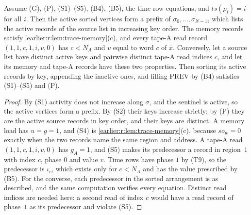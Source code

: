 \begin{lemma}\label{earlier:r:lem:trace-sorted}
Assume (G), (P), (S1)--(S5), (B4), (B5), the time-row equations, and
\(\mathit{ts}(\rho_i)=i\) for all \(i\). Then the active sorted vertices
form a prefix of \(\sigma_0,\ldots,\sigma_{N-1}\), which lists the active
records of the source list in increasing key order. The memory records
satisfy \cref{earlier:r:lem:trace-memory}(c), and every tape-A read record
\((1,1,c,1,i,v,0)\) has \(c<N_A\) and \(v\) equal to word \(c\) of
\(\bar x\). Conversely, let a source list have distinct active keys and
pairwise distinct tape-A read indices \(c\), and let its memory and
tape-A records have these two properties. Then sorting its active
records by key, appending the inactive ones, and filling
\(\mathrm{PREV}\) by (B4) satisfies (S1)--(S5) and (P).
\end{lemma}
\begin{proof}
By (S1) activity does not increase along \(\sigma\), and the sentinel is
active, so the active vertices form a prefix. By (S2) their keys
increase strictly; by (P) they are the active source records in key
order, and their keys are distinct. A memory load has \(u=g=1\), and
(S4) is \cref{earlier:r:lem:trace-memory}(c), because \(\mathit{so}_w=0\) exactly
when the two records name the same region and address. A tape-A read
\((1,1,c,1,i,v,0)\) has \(g_A=1\), and (S5) makes its predecessor a
record in region~\(1\) with index \(c\), phase \(0\) and value \(v\).
Time rows have phase \(1\) by (T9), so the predecessor is \(\iota_c\),
which exists only for \(c<N_A\) and has the value prescribed by (B5).
For the converse, each predecessor in the sorted arrangement is as
described, and the same computation verifies every equation. Distinct
read indices are needed here: a second read of index \(c\) would have
a read record of phase~\(1\) as its predecessor and violate (S5).
\end{proof}

